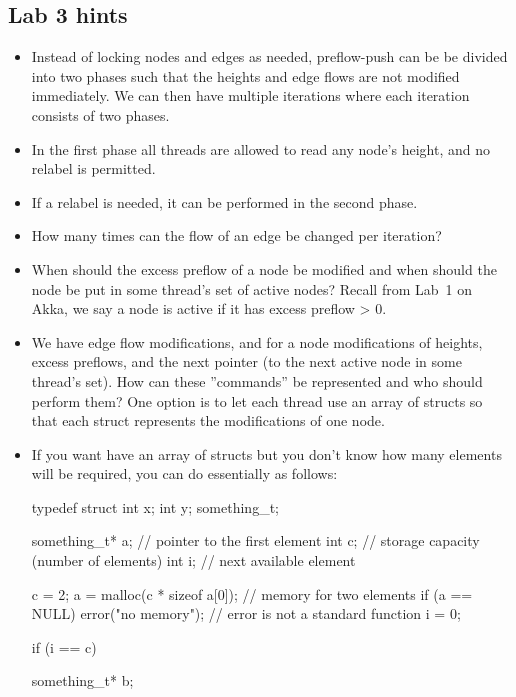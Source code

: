\documentclass{forsete}
\begin{document}
\subsection*{Lab 3 hints}

\begin{itemize}
\item Instead of locking nodes and edges as needed, preflow-push can be
be divided into two phases such that the heights and edge flows
are not modified immediately. We can then have multiple iterations
where each iteration consists of two phases.

\item In the first phase all threads are allowed to read any node's 
height, and no relabel is permitted.

\item If a relabel is needed, it can be performed in the second phase.

\item How many times can the flow of an edge
be changed per iteration?

\item When should the excess preflow of a node 
be modified and when should the node be
	put in some thread's set of active nodes? Recall from Lab~1 on
	Akka, we say a node is active if it has excess preflow > 0.

\item We have edge flow modifications, and for a node modifications
of heights, excess preflows, and
the next pointer (to the next active node in some thread's set).
How can these ''commands'' be represented and who should perform them? 
One option is to let each thread use an array of structs so that
each struct represents the modifications of one node.

\item If you want have an array of structs but you don't know how many elements
will be required, you can do essentially as follows:

\begin{ccode}
typedef struct {
	int	x;
	int	y;
} something_t;

something_t*		a;	// pointer to the first element
int			c;	// storage capacity (number of elements)
int			i;	// next available element

c = 2;
a = malloc(c * sizeof a[0]);	// memory for two elements
if (a == NULL)
	error("no memory");	// error is not a standard function
i = 0;

if (i == c) {
	something_t*	b;

}
\end{ccode}
\end{itemize}
\end{document}
